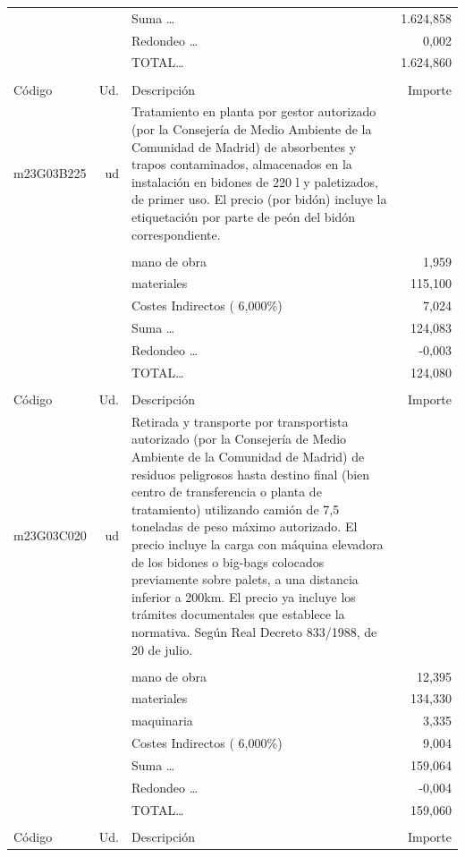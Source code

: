 \documentclass{book}%
\begin{document}
\begin{supertabular}{l r p{60mm} r}
&&Suma \ldots& 1.624,858\\%
&&Redondeo \ldots&     0,002\\%
%
&&TOTAL\ldots& 1.624,860\\%
&&&\\%
Código&Ud.&Descripción&Importe\\%
\hline%
m23G03B225&ud&Tratamiento en planta por gestor autorizado (por la Consejería de Medio Ambiente de la Comunidad de Madrid) de absorbentes y trapos contaminados, almacenados en la instalación en bidones de 220 l y paletizados, de primer uso. El precio (por bidón) incluye la etiquetación por parte de peón del bidón correspondiente.&\\%
&&&\\%
&&mano de obra&     1,959\\%
&&materiales&   115,100\\%
&&Costes Indirectos (     6,000\%)&     7,024\\%
&&Suma \ldots&   124,083\\%
&&Redondeo \ldots&    {-}0,003\\%
%
&&TOTAL\ldots&   124,080\\%
&&&\\%
Código&Ud.&Descripción&Importe\\%
\hline%
m23G03C020&ud&Retirada y transporte por transportista autorizado (por la Consejería de Medio Ambiente de la Comunidad de Madrid) de residuos peligrosos hasta destino final (bien centro de transferencia o planta de tratamiento) utilizando camión de 7,5 toneladas de peso máximo autorizado. El precio incluye la carga con máquina elevadora de los bidones o big{-}bags colocados previamente sobre palets, a una distancia inferior a 200km. El precio ya incluye los trámites documentales que establece la normativa. Según Real Decreto 833/1988, de 20 de julio.&\\%
&&&\\%
&&mano de obra&    12,395\\%
&&materiales&   134,330\\%
&&maquinaria&     3,335\\%
&&Costes Indirectos (     6,000\%)&     9,004\\%
&&Suma \ldots&   159,064\\%
&&Redondeo \ldots&    {-}0,004\\%
%
&&TOTAL\ldots&   159,060\\%
&&&\\%
Código&Ud.&Descripción&Importe\\%

\end{supertabular}
\end{document}
